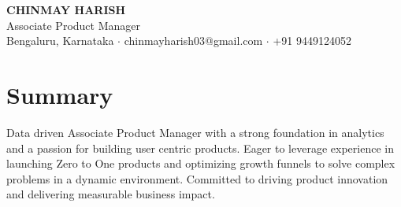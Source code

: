 \documentclass[a4paper,10pt]{article}
\begin{document}
\pagestyle{empty}
\begin{center}
    {\Huge \textbf{CHINMAY HARISH}} \\ \vspace{2pt}
    {\Large Associate Product Manager} \\ \vspace{4pt}
    Bengaluru, Karnataka $\cdot$ chinmayharish03@gmail.com $\cdot$ +91 9449124052 \\ \vspace{5pt}
    \href{https://github.com/ChinmayHarish}{\Large\faGithub} \quad
    \href{https://www.linkedin.com/in/chinmay-harish-03106t/}{\Large\faLinkedin} \quad
    \href{https://chinmay-portfolio-p1.netlify.app/}{\Large\faGlobe}
\end{center}
\section{Summary}
Data driven Associate Product Manager with a strong foundation in analytics and a passion for building user centric products. Eager to leverage experience in launching Zero to One products and optimizing growth funnels to solve complex problems in a dynamic environment. Committed to driving product innovation and delivering measurable business impact.
\end{document}
